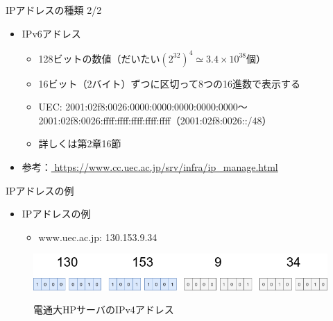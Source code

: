 \documentclass[12pt,aspectratio=169]{beamer}
\begin{document}
\begin{frame}{IPアドレスの種類 2/2}

  \begin{itemize}
    \item IPv6アドレス
      \begin{itemize}
        \item 128ビットの数値（だいたい\( (2^{32})^4 \simeq 3.4 \times 10^{38} \)個）
        \item 16ビット（2バイト）ずつに区切って8つの16進数で表示する
        \item UEC: 2001:02f8:0026:0000:0000:0000:0000:0000〜2001:02f8:0026:ffff:ffff:ffff:ffff:ffff（2001:02f8:0026::/48）
        \item 詳しくは第2章16節
      \end{itemize}
    \item { \small 参考：\url { https://www.cc.uec.ac.jp/srv/infra/ip_manage.html } }

  \end{itemize}

\end{frame}


\begin{frame}{IPアドレスの例}

  \begin{itemize}
    \item IPアドレスの例
      \begin{itemize}
        \item www.uec.ac.jp: 130.153.9.34
      \end{itemize}

  \end{itemize}

  \begin{figure}
    \centering
    \includegraphics[width=12cm,bb=0 0 741 91]{./figures/ipaddr.png}
    \label{fig:ipaddr}
    \caption{電通大HPサーバのIPv4アドレス}
  \end{figure}

\end{frame}
\end{document}
